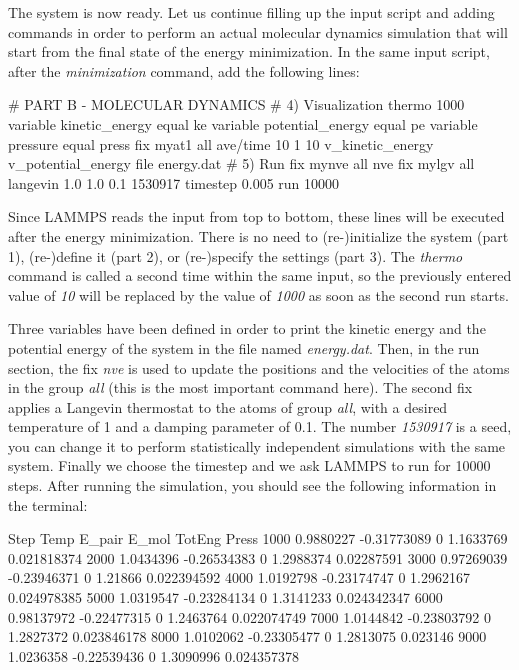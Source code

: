 \noindent The system is now ready. Let us continue filling up the
input script and adding commands in order to perform an actual molecular dynamics
simulation that will start from the final state of the energy minimization.
In the same input script, after the \textit{minimization} command, add the following
lines:

\begin{lcverbatim}
# PART B - MOLECULAR DYNAMICS
# 4) Visualization
thermo 1000
variable kinetic_energy equal ke
variable potential_energy equal pe
variable pressure equal press
fix myat1 all ave/time 10 1 10 v_kinetic_energy v_potential_energy file energy.dat
# 5) Run
fix mynve all nve
fix mylgv all langevin 1.0 1.0 0.1 1530917
timestep 0.005
run 10000
\end{lcverbatim}

\noindent Since LAMMPS reads the input from top to
bottom, these lines will be executed after the energy
minimization. There is no need to (re-)initialize the system
(part 1), (re-)define it (part 2), or (re-)specify the settings
(part 3). The \textit{thermo} command is called a second time within the 
same input, so the previously entered value of \textit{10} will be replaced
by the value of \textit{1000} as soon as the second run starts.

Three variables have been defined in order
to print the kinetic energy and the potential energy 
of the system in the file named \textit{energy.dat}. Then,
in the run section, the fix \textit{nve} is used to update the
positions and the velocities of the atoms in the group
\textit{all} (this is the most important command here). The second
fix applies a Langevin thermostat to the atoms of group
\textit{all}, with a desired temperature of 1 and a damping
parameter of 0.1. The number \textit{1530917} is a seed, you can
change it to perform statistically independent simulations
with the same system. Finally we choose the timestep
and we ask LAMMPS to run for 10000 steps. After running
the simulation, you should see the following information in
the terminal:

\begin{lcverbatim}
Step         Temp       E_pair    E_mol       TotEng        Press
1000    0.9880227  -0.31773089        0    1.1633769  0.021818374 
2000    1.0434396  -0.26534383        0    1.2988374   0.02287591 
3000   0.97269039  -0.23946371        0      1.21866  0.022394592 
4000    1.0192798  -0.23174747        0    1.2962167  0.024978385 
5000    1.0319547  -0.23284134        0    1.3141233  0.024342347 
6000   0.98137972  -0.22477315        0    1.2463764  0.022074749 
7000    1.0144842  -0.23803792        0    1.2827372  0.023846178 
8000    1.0102062  -0.23305477        0    1.2813075     0.023146 
9000    1.0236358  -0.22539436        0    1.3090996  0.024357378 
\end{lcverbatim}

